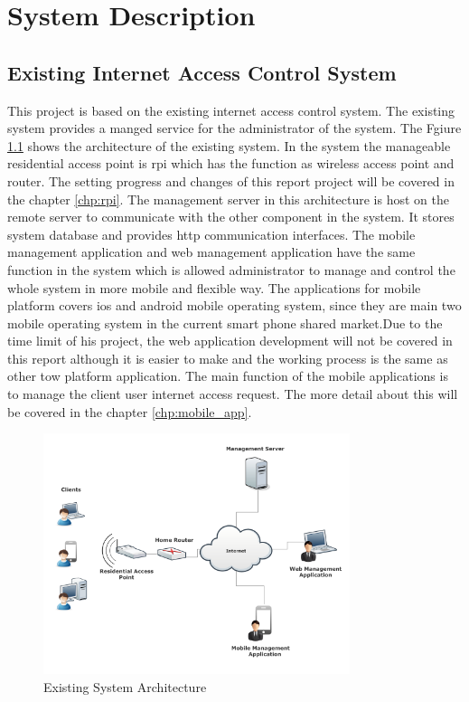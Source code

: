 \chapter{System Description}
\label{chp:system_description}

\section{Existing Internet Access Control System}
\par This project is based on the existing internet access control system. The existing system provides a manged service for the administrator of the system. The Fgiure \ref{fig:presystem} shows the architecture of the existing system. In the system the manageable residential access point is \gls{rpi} which has the function as wireless access point and router. The setting progress and changes of this report project will be covered in the chapter \ref{chp:rpi}. The management server in this architecture is host on the remote server to communicate with the other component in the system. It stores system database and provides \gls{http} communication interfaces. The mobile management application and web management application have the same function in the system which is allowed administrator to manage and control the whole system in more mobile and flexible way. The applications for mobile platform covers \gls{ios} and android mobile operating system, since they are main two mobile operating system in the current smart phone shared market.Due to the time limit of his project, the web application development will not be covered in this report although it is easier to make and the working process is the same as other tow platform application. The main function of the mobile applications is to manage the client user internet access request. The more detail about this will be covered in the chapter \ref{chp:mobile_app}.
\begin{figure}
	\centering
    	\includegraphics[width=0.80\textwidth,natwidth=610,natheight=642]{figs/presystem.png}
  	\caption{Existing System Architecture}
  	\label{fig:presystem}
\end{figure}

